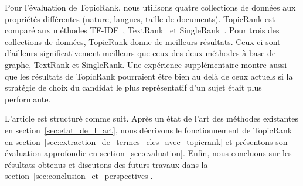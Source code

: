   Pour l'évaluation de TopicRank, nous utilisons quatre collections de données
  aux propriétés différentes (nature, langues, taille de documents). TopicRank
  est comparé aux méthodes TF-IDF~\cite{jones1972tfidf},
  TextRank~\cite{mihalcea2004textrank} et SingleRank~\cite{wan2008expandrank}.
  Pour trois des collections de données, TopicRank donne de meilleurs résultats.
  Ceux-ci sont d'ailleurs significativement meilleurs que ceux des deux méthodes
  à base de graphe, TextRank et SingleRank.
  Une expérience supplémentaire montre aussi que les résultats de TopicRank
  pourraient être bien au delà de ceux actuels si la stratégie de choix du
  candidat le plus représentatif d'un sujet était plus performante.

  L'article est structuré comme suit. Après un état de l'art des méthodes
  existantes en section~\ref{sec:etat_de_l_art}, nous décrivons le
  fonctionnement de TopicRank en
  section~\ref{sec:extraction_de_termes_cles_avec_topicrank} et présentons son
  évaluation approfondie en section~\ref{sec:evaluation}. Enfin, nous concluons
  sur les résultats obtenus et discutons des futurs travaux dans la
  section~\ref{sec:conclusion_et_perspectives}.

